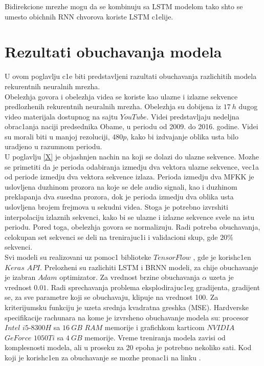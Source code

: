 \documentclass[a4paper, openany, oneside, 11pt]{book}
\begin{document}
Bidirekcione mrezhe mogu da se kombinuju sa \acrshort{LSTM} modelom tako shto se umesto obichnih \acrshort{RNN} chvorova koriste \acrshort{LSTM} c1elije.
\chapter{Rezultati obuchavanja modela}
U ovom poglavlju c1e biti predstavljeni razultati obuchavanja razlichitih modela rekurentnih neuralnih mrezha.\\
Obelezhja govora i obelezhja videa se koriste kao ulazne i izlazne sekvence predlozhenih rekurentnih neuralnih mrezha. Obelezhja su dobijena iz $\SI{17}{h}$ dugog video materijala dostupnog na sajtu $YouTube$. Videi predstavljaju nedeljna obrac1anja naciji predsednika Obame, u periodu od 2009. do 2016. godine. Videi su morali biti u manjoj rezoluciji, $480p$, kako bi izdvajanje oblika usta bilo uradjeno u razumnom periodu.\\
U poglavlju \ref{X} je objash\-njen nachin na koji se dolazi do ulazne sekvence. Mozhe se primetiti da je perioda odabiranja izmedju dva vektora ulazne sekvence, vec1a od periode izmedju dva vektora sekvence izlaza. Perioda izmedju dva \acrshort{MFKK} je uslovljena duzhinom prozora na koje se dele audio signali, kao i duzhinom preklapanja dva susedna prozora, dok je perioda izmedju dva oblika usta uslovljena brojem frejmova u sekudni videa. Stoga je potrebno  izvrshiti interpolaciju izlaznih sekvenci, kako bi se ulazne i izlazne sekvence svele na istu periodu. Pored toga, obelezhja govora se normalizuju. Radi potreba obuchavanja, celokupan set sekvenci se deli na trenirajuc1i i validacioni skup, gde $20\%$ sekvenci.\\
Svi modeli su realizovani uz pomoc1 biblioteke $TensorFlow$ \cite{TF}, gde je korish\-c1en $Keras$ $API$. Prelozheni su razlichiti \acrshort{LSTM} i \acrshort{BRNN} modeli, za chije obuchavanje je izabran $Adam$ \cite{Adam} optimizator. Za vrednost brzine obuchavanja $\alpha$ uzeta je vrednost $0.01$. Radi sprechavanja problema eksplodirajuc1eg gradijenta, gradijent se, za sve parametre koji se obuchavaju, klipuje na vrednost 100. Za kriterijumsku funkciju je uzeta srednja kvadratna greshka (\acrshort{MSE}). Hardverske specifikacije rachunara na kome je izvrsheno obuchavanje modela su: procesor $Intel$ $i5$-$8300H$ sa $\SI{16}{GB}$ $RAM$ memorije i grafichkom karticom $NVIDIA$ $GeForce$ $1050Ti$ sa $\SI{4}{GB}$ memorije. Vreme treniranja modela zavisi od komplesnosti modela, ali u proseku za 20 epoha je potrebno nekoliko sati. Kod koji je korish\-c1en za obuchavanje se mozhe pronac1i na linku \cite{gh3}.
\end{document}
